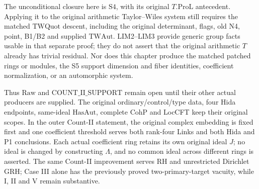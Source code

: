 The unconditional closure here is \(\mathrm{S4}\), with its
original \(T.\mathrm{ProL}\) antecedent.  Applying it to the
original arithmetic Taylor--Wiles system still requires the matched
\(\mathrm{TWQuot}\) descent, including the original determinant,
flags, old N4, point, B1/B2 and supplied \(\mathrm{TWAut}\).
LIM2--LIM3 provide generic group facts usable in that separate proof;
they do not assert that the original arithmetic \(T\) already has
trivial residual.  Nor does this chapter produce the matched
patched rings or modules, the S5 support dimension and fiber
identities, coefficient normalization, or an automorphic system.

Thus \(\mathrm{Raw}\) and \(\mathrm{COUNT\_II\_SUPPORT}\) remain
open until their other actual producers are supplied.  The original
ordinary/control/type data, four Hida endpoints, same-ideal
\(\mathrm{HasAut}\), complete CohP and LocCFT keep their original
scopes.  In the outer Count-II statement, the original complex
embedding is fixed first and one coefficient threshold serves both
rank-four Links and both Hida and P1 conclusions.  Each actual
coefficient ring retains its own original ideal \(J\); no ideal is
changed by constructing \(\Lambda\), and no common ideal across
different rings is asserted.  The same Count-II improvement serves
RH and unrestricted Dirichlet GRH; Case III alone has the previously
proved two-primary-target vacuity, while I, II and V remain substantive.
